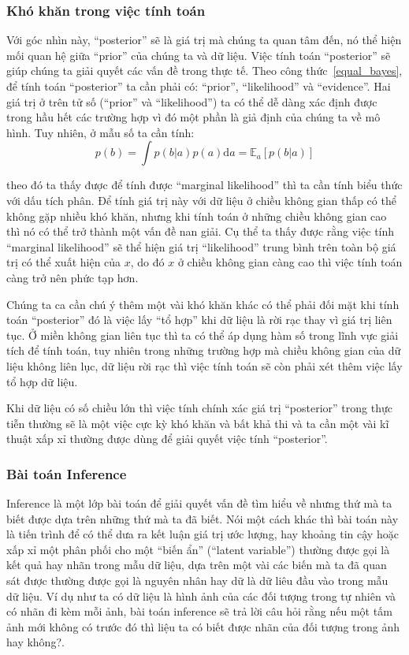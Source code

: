         \subsubsection{Khó khăn trong việc tính toán}
        Với góc nhìn này, ``posterior'' sẽ là giá trị mà chúng ta quan tâm đến, nó thể hiện mối quan hệ giữa ``prior'' của chúng ta và dữ liệu. 
        Việc tính toán ``posterior'' sẽ giúp chúng ta giải quyết các vấn đề trong thực tế.
        Theo công thức~\ref{equal_bayes}, để tính toán ``posterior'' ta cần phải có: ``prior'', ``likelihood'' và ``evidence''. Hai giá trị ở trên tử số (``prior'' và ``likelihood'') ta có thể dễ dàng xác định được trong hầu hết các trường hợp vì đó một phần là giả định của chúng ta về mô hình. Tuy nhiên, ở mẫu số ta cần tính:
        \begin{equation}
        \label{equal_evidence}
            p(b) = \int {p(b|a)p(a)\text{d}a = \mathbb{E}_a[p(b|a)]}    
        \end{equation}
        
        theo đó ta thấy được để tính được ``marginal likelihood'' thì ta cần tính biểu thức với dấu tích phân. Để tính giá trị này với dữ liệu ở chiều không gian thấp có thể không gặp nhiều khó khăn, nhưng khi tính toán ở những chiều không gian cao thì nó có thể trở thành một vấn đề nan giải. 
        Cụ thể ta thấy được rằng việc tính ``marginal likelihood'' sẽ thể hiện giá trị ``likelihood'' trung bình trên toàn bộ giá trị có thể xuất hiện của $x$, do đó $x$ ở chiều không gian càng cao thì việc tính toán càng trở nên phức tạp hơn. 

        Chúng ta ca cần chú ý thêm một vài khó khăn khác có thể phải đối mặt khi tính toán ``posterior'' đó là việc lấy ``tổ hợp'' khi dữ liệu là rời rạc thay vì giá trị liên tục. 
        Ở miền không gian liên tục thì ta có thể áp dụng hàm số trong lĩnh vực giải tích để tính toán, tuy nhiên trong những trường hợp mà chiều không gian của dữ liệu không liên lục, dữ liệu rời rạc thì việc tính toán sẽ còn phải xét thêm việc lấy tổ hợp dữ liệu. 

        Khi dữ liệu có số chiều lớn thì việc tính chính xác giá trị ``posterior'' trong thực tiễn thường sẽ là một việc cực kỳ khó khăn và bất khả thi và ta cần một vài kĩ thuật xấp xỉ thường được dùng để giải quyết việc tính ``posterior''. 

        \subsubsection{Bài toán Inference}
        Inference là một lớp bài toán để giải quyết vấn đề tìm hiểu về nhưng thứ mà ta biết được dựa trên những thứ mà ta đã biết. Nói một cách khác thì bài toán này là tiến trình để có thể dưa ra kết luận giá trị ước lượng, hay khoảng tin cậy hoặc xấp xỉ một phân phối cho một ``biến ẩn'' (``latent variable'') thường được gọi là kết quả hay nhãn trong mẫu dữ liệu, dựa trên một vài các biến mà ta đã quan sát được thường được gọi là nguyên nhân hay dữ là dữ liêu đầu vào trong mẫu dữ liệu. Ví dụ như ta có dữ liệu là hình ảnh của các đối tượng trong tự nhiên và có nhãn đi kèm mỗi ảnh, bài toán inference sẽ trả lời câu hỏi rằng nếu một tấm ảnh mới không có trước đó thì liệu ta có biết được nhãn của đối tượng trong ảnh hay không?. 

